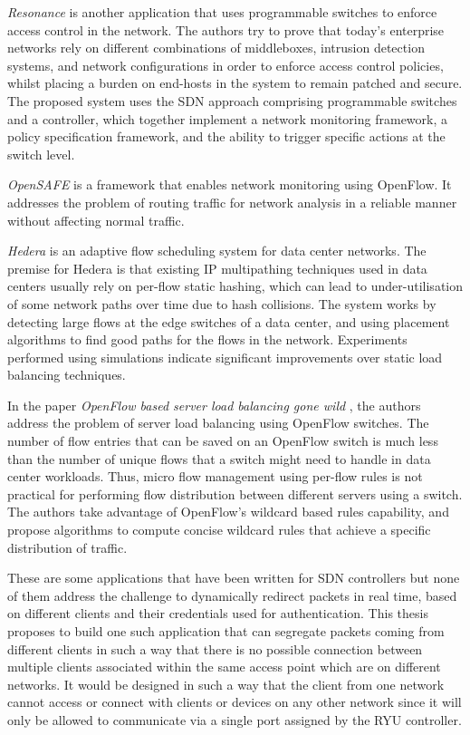 \textit{Resonance} \cite{Nayak:2009:RDA:1592681.1592684} is another application that uses programmable switches to enforce access control in the network. The authors try to prove that today’s enterprise networks rely on different combinations of middleboxes, intrusion detection systems, and network configurations in order to enforce access control policies, whilst placing a burden on end-hosts in the system to remain patched and secure. The proposed system uses the SDN approach comprising programmable switches and a controller, which together implement a network monitoring framework, a policy specification framework, and the ability to trigger specific actions at the switch level.

\textit{OpenSAFE} \cite{ballard2010extensible} is a framework that enables network monitoring using OpenFlow. It addresses the problem of routing traffic for network analysis in a reliable manner without affecting normal traffic. 

\textit{Hedera} \cite{al2010hedera} is an adaptive flow scheduling system for data center networks. The premise for Hedera is that existing IP multipathing techniques used in data centers usually rely on per-flow static hashing, which can lead to under-utilisation of some network paths over time due to hash collisions. The system works by detecting large flows at the edge switches of a data center, and using placement algorithms to find good paths for the flows in the network. Experiments performed using simulations indicate significant improvements over static load balancing techniques. 

In the paper \textit{OpenFlow based server load balancing gone wild} \cite{wang2011openflow}, the authors address the problem of server load balancing using OpenFlow switches. The number of flow entries that can be saved on an OpenFlow switch is much less than the number of unique flows that a switch might need to handle in data center workloads. Thus, micro flow management using per-flow rules is not practical for performing flow distribution between different servers using a switch. The authors take advantage of OpenFlow’s wildcard based rules capability, and propose algorithms to compute concise wildcard rules that achieve a specific distribution of traffic.

These are some applications that have been written for SDN controllers but none of them address the challenge to dynamically redirect packets in real time, based on different clients and their credentials used for authentication. This thesis proposes to build one such application that can segregate packets coming from different clients in such a way that there is no possible connection between multiple clients associated within the same access point which are on different networks. It would be designed in such a way that the client from one network cannot access or connect with clients or devices on any other network since it will only be allowed to communicate via a single port assigned by the RYU controller.

